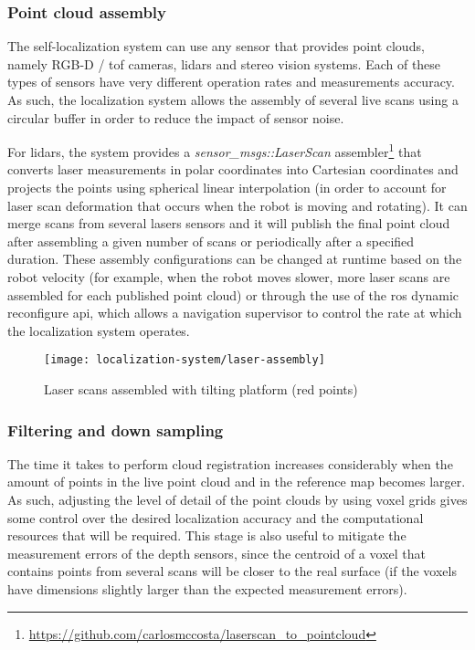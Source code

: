 \subsubsection{Point cloud assembly}

The self-localization system can use any sensor that provides point clouds, namely RGB-D / \gls{tof} cameras, \glspl{lidar} and stereo vision systems. Each of these types of sensors have very different operation rates and measurements accuracy. As such, the localization system allows the assembly of several live scans using a circular buffer in order to reduce the impact of sensor noise.

For \glspl{lidar}, the system provides a \emph{sensor\_msgs::LaserScan} assembler\footnote{\url{https://github.com/carlosmccosta/laserscan_to_pointcloud}} that converts laser measurements in polar coordinates into Cartesian coordinates and projects the points using spherical linear interpolation (in order to account for laser scan deformation that occurs when the robot is moving and rotating). It can merge scans from several lasers sensors and it will publish the final point cloud after assembling a given number of scans or periodically after a specified duration. These assembly configurations can be changed at runtime based on the robot velocity (for example, when the robot moves slower, more laser scans are assembled for each published point cloud) or through the use of the \gls{ros} dynamic reconfigure \gls{api}, which allows a navigation supervisor to control the rate at which the localization system operates.


\begin{figure}[H]
	\centering
	\texttt{[image: localization-system/laser-assembly]}
	\caption{Laser scans assembled with tilting platform (red points)}
	\label{fig:localization-system_section_laser_assembly}
\end{figure}


\subsubsection{Filtering and down sampling}

The time it takes to perform cloud registration increases considerably when the amount of points in the live point cloud and in the reference map becomes larger. As such, adjusting the level of detail of the point clouds by using voxel grids gives some control over the desired localization accuracy and the computational resources that will be required. This stage is also useful to mitigate the measurement errors of the depth sensors, since the centroid of a voxel that contains points from several scans will be closer to the real surface (if the voxels have dimensions slightly larger than the expected measurement errors).

